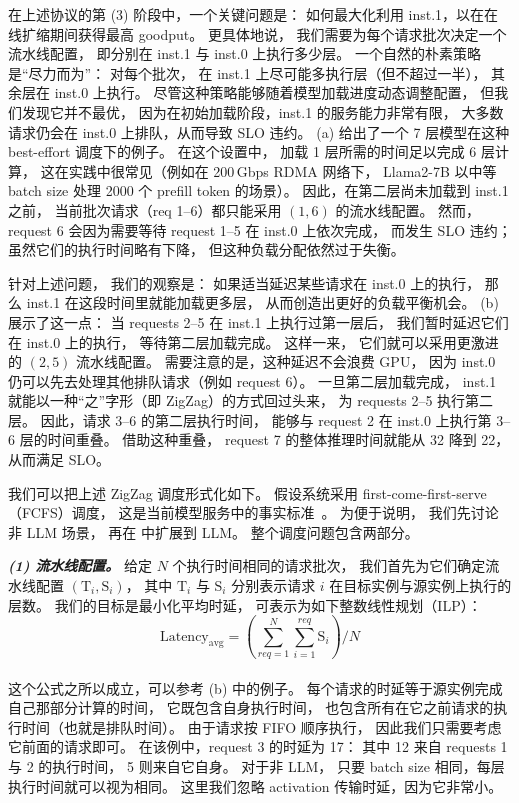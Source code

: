 在上述协议的第 (3) 阶段中，一个关键问题是：
如何最大化利用 inst.1，以在在线扩缩期间获得最高 goodput。
更具体地说，
我们需要为每个请求批次决定一个流水线配置，
即分别在 inst.1 与 inst.0 上执行多少层。
一个自然的朴素策略是“尽力而为”：
对每个批次，
在 inst.1 上尽可能多执行层（但不超过一半），
其余层在 inst.0 上执行。
尽管这种策略能够随着模型加载进度动态调整配置，
但我们发现它并不最优，
因为在初始加载阶段，inst.1 的服务能力非常有限，
大多数请求仍会在 inst.0 上排队，从而导致 SLO 违约。
{} (a) 给出了一个 7 层模型在这种 best-effort 调度下的例子。
在这个设置中，
加载 1 层所需的时间足以完成 6 层计算，
这在实践中很常见（例如在 200\,Gbps RDMA 网络下，
Llama2-7B 以中等 batch size 处理 2000 个 prefill token 的场景）。
因此，在第二层尚未加载到 inst.1 之前，
当前批次请求（req 1--6）都只能采用 $(1,6)$ 的流水线配置。
然而，request 6 会因为需要等待 request 1--5 在 inst.0 上依次完成，
而发生 SLO 违约；
虽然它们的执行时间略有下降，
但这种负载分配依然过于失衡。

针对上述问题，
我们的观察是：
如果适当延迟某些请求在 inst.0 上的执行，
那么 inst.1 在这段时间里就能加载更多层，
从而创造出更好的负载平衡机会。
{} (b) 展示了这一点：
当 requests 2--5 在 inst.1 上执行过第一层后，
我们暂时延迟它们在 inst.0 上的执行，
等待第二层加载完成。
这样一来，
它们就可以采用更激进的 $(2,5)$ 流水线配置。
需要注意的是，这种延迟不会浪费 GPU，
因为 inst.0 仍可以先去处理其他排队请求（例如 request 6）。
一旦第二层加载完成，
inst.1 就能以一种“之”字形（即 ZigZag）的方式回过头来，
为 requests 2--5 执行第二层。
因此，请求 3--6 的第二层执行时间，
能够与 request 2 在 inst.0 上执行第 3--6 层的时间重叠。
借助这种重叠，
request 7 的整体推理时间就能从 32 降到 22，
从而满足 SLO。

我们可以把上述 ZigZag 调度形式化如下。
假设系统采用 first-come-first-serve（FCFS）调度，
这是当前模型服务中的事实标准~\cite{vllm,DBLP:journals/corr/abs-2404-09526,DBLP:conf/osdi/YuJKKC22}。
为便于说明，
我们先讨论非 LLM 场景，
再在 \textsection{\ref{sec:design-llm}} 中扩展到 LLM。
整个调度问题包含两部分。

\emph{\textbf{(1) 流水线配置。}}
给定 $N$ 个执行时间相同的请求批次，
我们首先为它们确定流水线配置 $(\text{T}_i, \text{S}_i)$，
其中 $\text{T}_i$ 与 $\text{S}_i$ 分别表示请求 $i$ 在目标实例与源实例上执行的层数。
我们的目标是最小化平均时延，
可表示为如下整数线性规划（ILP）：\\[-5pt]
\[
 \text{Latency}_\text{avg} = (\sum_{req=1}^{N} \sum_{i=1}^{req} \text{S}_{i}) / N
\] \\[-3pt]
\noindent
这个公式之所以成立，可以参考 {} (b) 中的例子。
每个请求的时延等于源实例完成自己那部分计算的时间，
它既包含自身执行时间，
也包含所有在它之前请求的执行时间（也就是排队时间）。
由于请求按 FIFO 顺序执行，
因此我们只需要考虑它前面的请求即可。
在该例中，request 3 的时延为 17：
其中 12 来自 requests 1 与 2 的执行时间，
5 则来自它自身。
对于非 LLM，
只要 batch size 相同，每层执行时间就可以视为相同。
这里我们忽略 activation 传输时延，因为它非常小。

